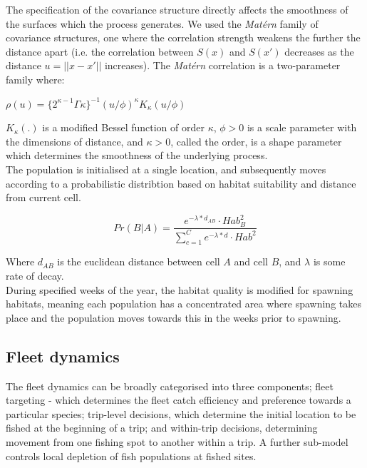 \documentclass[review]{elsarticle}
\begin{document}
The specification of the covariance structure directly affects the smoothness
of the surfaces which the process generates.  We used the \textit{Matérn}
family of covariance structures, one where the correlation strength weakens the
further the distance apart (i.e. the correlation between $S(x)$ and $S(x')$
decreases as the distance $u = ||x - x'||$ increases).  The \textit{Matérn}
correlation is a two-parameter family where: \\

\begin{center}
	$\rho(u) = \{2^{\kappa -
		1}\Gamma{\kappa}\}^{-1}(u/\phi)^{\kappa}K_{\kappa}(u/\phi)$
\end{center}
	
$K_{\kappa}(.)$ is a modified Bessel function of order $\kappa$, $\phi >
0$ is a scale parameter with the dimensions of distance, and $\kappa > 0$,
called the order, is a shape parameter which determines the smoothness of the
underlying process. \\

The population is initialised at a single location, and subsequently moves
according to a probabilistic distribtion based on habitat suitability and
distance from current cell. 

\begin{equation}
	Pr(B | A) = \frac{e^{-\lambda * d_{AB}} \cdot
		Hab_{B}^2}{\sum\limits_{c=1}^{C}e^{-\lambda * d} \cdot
		Hab^2}
\end{equation}

Where $d_{AB}$ is the euclidean distance between cell $A$ and cell $B$, and
$\lambda$ is some rate of decay.\\

During specified weeks of the year, the habitat quality is modified for
spawning habitats, meaning each population has a concentrated area where
spawning takes place and the population moves towards this in the weeks prior
to spawning. \\

\subsection{Fleet dynamics}

The fleet dynamics can be broadly categorised into three components; fleet
targeting - which determines the fleet catch efficiency and preference towards
a particular species; trip-level decisions, which determine the initial
location to be fished at the beginning of a trip; and within-trip decisions,
determining movement from one fishing spot to another within a trip.  A further
sub-model controls local depletion of fish populations at fished sites. 
\end{document}
